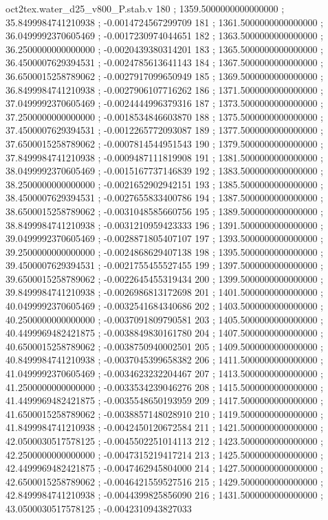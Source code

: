 \begin{filecontents}[overwrite]{oct2tex.water_d25_v800_P.stab.v}
180 ; 1359.5000000000000000 ; 35.8499984741210938 ; -0.0014724567299709
181 ; 1361.5000000000000000 ; 36.0499992370605469 ; -0.0017230974044651
182 ; 1363.5000000000000000 ; 36.2500000000000000 ; -0.0020439380314201
183 ; 1365.5000000000000000 ; 36.4500007629394531 ; -0.0024785613641143
184 ; 1367.5000000000000000 ; 36.6500015258789062 ; -0.0027917099650949
185 ; 1369.5000000000000000 ; 36.8499984741210938 ; -0.0027906107716262
186 ; 1371.5000000000000000 ; 37.0499992370605469 ; -0.0024444996379316
187 ; 1373.5000000000000000 ; 37.2500000000000000 ; -0.0018534846603870
188 ; 1375.5000000000000000 ; 37.4500007629394531 ; -0.0012265772093087
189 ; 1377.5000000000000000 ; 37.6500015258789062 ; -0.0007814544951543
190 ; 1379.5000000000000000 ; 37.8499984741210938 ; -0.0009487111819908
191 ; 1381.5000000000000000 ; 38.0499992370605469 ; -0.0015167737146839
192 ; 1383.5000000000000000 ; 38.2500000000000000 ; -0.0021652902942151
193 ; 1385.5000000000000000 ; 38.4500007629394531 ; -0.0027655833400786
194 ; 1387.5000000000000000 ; 38.6500015258789062 ; -0.0031048585660756
195 ; 1389.5000000000000000 ; 38.8499984741210938 ; -0.0031210959423333
196 ; 1391.5000000000000000 ; 39.0499992370605469 ; -0.0028871805407107
197 ; 1393.5000000000000000 ; 39.2500000000000000 ; -0.0024868629407138
198 ; 1395.5000000000000000 ; 39.4500007629394531 ; -0.0021755455527455
199 ; 1397.5000000000000000 ; 39.6500015258789062 ; -0.0022645455319434
200 ; 1399.5000000000000000 ; 39.8499984741210938 ; -0.0026986813172698
201 ; 1401.5000000000000000 ; 40.0499992370605469 ; -0.0032541684340686
202 ; 1403.5000000000000000 ; 40.2500000000000000 ; -0.0037091809790581
203 ; 1405.5000000000000000 ; 40.4499969482421875 ; -0.0038849830161780
204 ; 1407.5000000000000000 ; 40.6500015258789062 ; -0.0038750940002501
205 ; 1409.5000000000000000 ; 40.8499984741210938 ; -0.0037045399658382
206 ; 1411.5000000000000000 ; 41.0499992370605469 ; -0.0034623232204467
207 ; 1413.5000000000000000 ; 41.2500000000000000 ; -0.0033534239046276
208 ; 1415.5000000000000000 ; 41.4499969482421875 ; -0.0035548650193959
209 ; 1417.5000000000000000 ; 41.6500015258789062 ; -0.0038857148028910
210 ; 1419.5000000000000000 ; 41.8499984741210938 ; -0.0042450120672584
211 ; 1421.5000000000000000 ; 42.0500030517578125 ; -0.0045502251014113
212 ; 1423.5000000000000000 ; 42.2500000000000000 ; -0.0047315219417214
213 ; 1425.5000000000000000 ; 42.4499969482421875 ; -0.0047462945804000
214 ; 1427.5000000000000000 ; 42.6500015258789062 ; -0.0046421559527516
215 ; 1429.5000000000000000 ; 42.8499984741210938 ; -0.0044399825856090
216 ; 1431.5000000000000000 ; 43.0500030517578125 ; -0.0042310943827033

\end{filecontents}
